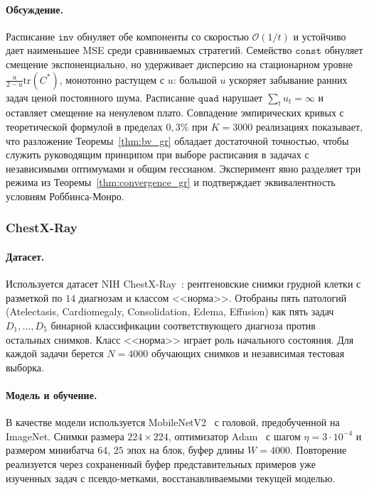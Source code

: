 \documentclass[a4paper,14pt,oneside,openany]{extarticle}
\begin{document}
\paragraph{Обсуждение.}
Расписание $\texttt{inv}$ обнуляет обе компоненты со скоростью $\mathcal{O}(1/t)$ и устойчиво дает наименьшее MSE среди сравниваемых стратегий. Семейство $\texttt{const}$ обнуляет смещение экспоненциально, но удерживает дисперсию на стационарном уровне $\tfrac{u}{2-u}\mathrm{tr}(C^*)$, монотонно растущем с $u$: большой $u$ ускоряет забывание ранних задач ценой постоянного шума. Расписание $\texttt{quad}$ нарушает $\sum_t u_t = \infty$ и оставляет смещение на ненулевом плато. Совпадение эмпирических кривых с теоретической формулой в пределах $0{,}3\%$ при $K = 3000$ реализациях показывает, что разложение Теоремы~\ref{thm:bv_gr} обладает достаточной точностью, чтобы служить руководящим принципом при выборе расписания в задачах с независимыми оптимумами и общим гессианом. Эксперимент явно разделяет три режима из Теоремы~\ref{thm:convergence_gr} и подтверждает эквивалентность условиям Роббинса-Монро.

\subsubsection{ChestX-Ray}\label{sec:exp_cxr}

\paragraph{Датасет.}
Используется датасет NIH ChestX-Ray~\cite{wang2017chestx}: рентгеновские снимки грудной клетки с разметкой по $14$ диагнозам и классом <<норма>>. Отобраны пять патологий (Atelectasis, Cardiomegaly, Consolidation, Edema, Effusion) как пять задач $D_1, \ldots, D_5$ бинарной классификации соответствующего диагноза против остальных снимков. Класс <<норма>> играет роль начального состояния. Для каждой задачи берется $N = 4000$ обучающих снимков и независимая тестовая выборка.

\paragraph{Модель и обучение.}
В качестве модели используется MobileNetV2~\cite{sandler2018mobilenetv2} с головой, предобученной на ImageNet. Снимки размера $224 \times 224$, оптимизатор Adam~\cite{kingma2014adam} с шагом $\eta = 3 \cdot 10^{-4}$ и размером минибатча $64$, $25$ эпох на блок, буфер длины $W = 4000$. Повторение реализуется через сохраненный буфер представительных примеров уже изученных задач с псевдо-метками, восстанавливаемыми текущей моделью.
\end{document}
